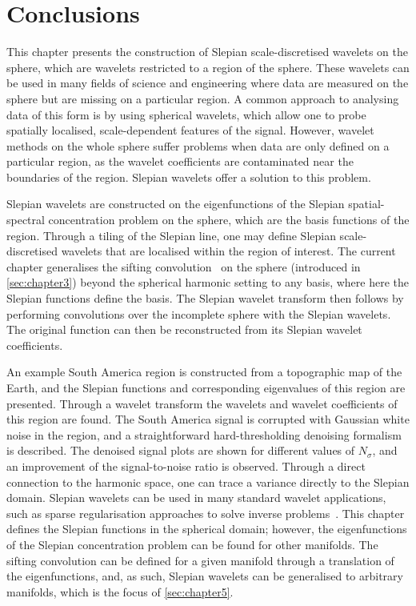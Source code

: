 

\section{Conclusions}\label{sec:chapter4_conclusion}

This chapter presents the construction of Slepian scale-discretised wavelets on the sphere, which are wavelets restricted to a region of the sphere.
These wavelets can be used in many fields of science and engineering where data are measured on the sphere but are missing on a particular region.
A common approach to analysing data of this form is by using spherical wavelets, which allow one to probe spatially localised, scale-dependent features of the signal.
However, wavelet methods on the whole sphere suffer problems when data are only defined on a particular region, as the wavelet coefficients are contaminated near the boundaries of the region.
Slepian wavelets offer a solution to this problem.

Slepian wavelets are constructed on the eigenfunctions of the Slepian spatial-spectral concentration problem on the sphere, which are the basis functions of the region.
Through a tiling of the Slepian line, one may define Slepian scale-discretised wavelets that are localised within the region of interest.
The current chapter generalises the sifting convolution~\cite{Roddy2021} on the sphere (introduced in \cref{sec:chapter3}) beyond the spherical harmonic setting to any basis, where here the Slepian functions define the basis.
The Slepian wavelet transform then follows by performing convolutions over the incomplete sphere with the Slepian wavelets.
The original function can then be reconstructed from its Slepian wavelet coefficients.

An example South America region is constructed from a topographic map of the Earth, and the Slepian functions and corresponding eigenvalues of this region are presented.
Through a wavelet transform the wavelets and wavelet coefficients of this region are found.
The South America signal is corrupted with Gaussian white noise in the region, and a straightforward hard-thresholding denoising formalism is described.
The denoised signal plots are shown for different values of \(N_{\sigma}\), and an improvement of the signal-to-noise ratio is observed.
Through a direct connection to the harmonic space, one can trace a variance directly to the Slepian domain.
Slepian wavelets can be used in many standard wavelet applications, such as sparse regularisation approaches to solve inverse problems~\cite{McEwen2013a,Wallis2017,Price2021}.
This chapter defines the Slepian functions in the spherical domain; however, the eigenfunctions of the Slepian concentration problem can be found for other manifolds.
The sifting convolution can be defined for a given manifold through a translation of the eigenfunctions, and, as such, Slepian wavelets can be generalised to arbitrary manifolds, which is the focus of \cref{sec:chapter5}.
